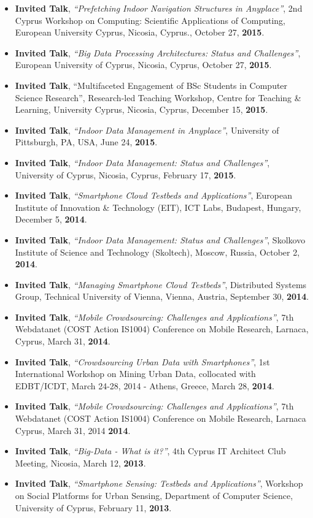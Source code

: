 \documentclass[10pt]{article}
\begin{document}
\begin{itemize}
\item  {\bf Invited Talk}, {\em ``Prefetching Indoor Navigation Structures in Anyplace''}, 2nd Cyprus Workshop on Computing: Scientific Applications of Computing, European University Cyprus, Nicosia, Cyprus., October 27, {\bf 2015}.
\item  {\bf Invited Talk}, {\em ``Big Data Processing Architectures: Status and Challenges''}, European University of Cyprus, Nicosia, Cyprus, October 27, {\bf 2015}.
\item  {\bf Invited Talk}, ``Multifaceted Engagement of BSc Students in Computer Science Research'', Research-led Teaching Workshop, Centre for Teaching \& Learning, University Cyprus, Nicosia, Cyprus, December 15, {\bf 2015}.
\item  {\bf Invited Talk}, {\em ``Indoor Data Management in Anyplace''}, University of Pittsburgh, PA, USA, June 24, {\bf 2015}.
\item  {\bf Invited Talk}, {\em ``Indoor Data Management: Status and Challenges''}, University of Cyprus, Nicosia, Cyprus, February 17,  {\bf 2015}.

\item  {\bf Invited Talk}, {\em ``Smartphone Cloud Testbeds and Applications''}, European Institute of Innovation \& Technology (EIT), ICT Labs, Budapest, Hungary, December 5, {\bf 2014}.
\item  {\bf Invited Talk}, {\em ``Indoor Data Management: Status and Challenges''}, Skolkovo Institute of Science and Technology (Skoltech), Moscow, Russia, October 2, {\bf 2014}.
\item  {\bf Invited Talk}, {\em ``Managing Smartphone Cloud Testbeds''}, Distributed Systems Group, Technical University of Vienna, Vienna, Austria, September 30, {\bf 2014}.
\item  {\bf Invited Talk}, {\em ``Mobile Crowdsourcing: Challenges and Applications''}, 7th Webdatanet (COST Action IS1004) Conference on Mobile Research, Larnaca, Cyprus, March 31, {\bf 2014}.
\item  {\bf Invited Talk}, {\em ``Crowdsourcing Urban Data with Smartphones''}, 1st International Workshop on Mining Urban Data, collocated with EDBT/ICDT, March 24-28, 2014 - Athens, Greece, March 28, {\bf 2014}.
\item  {\bf Invited Talk}, {\em ``Mobile Crowdsourcing: Challenges and Applications''},  7th Webdatanet (COST Action IS1004) Conference on Mobile Research, Larnaca Cyprus, March 31, 2014 {\bf 2014}.

\item  {\bf Invited Talk}, {\em ``Big-Data - What is it?''}, 4th Cyprus IT Architect Club Meeting, Nicosia, March 12, {\bf 2013}.
\item  {\bf Invited Talk}, {\em ``Smartphone Sensing: Testbeds and Applications''}, Workshop on Social Platforms for Urban Sensing, Department of Computer Science, University of Cyprus, February 11, {\bf 2013}.


\end{itemize}
\end{document}
